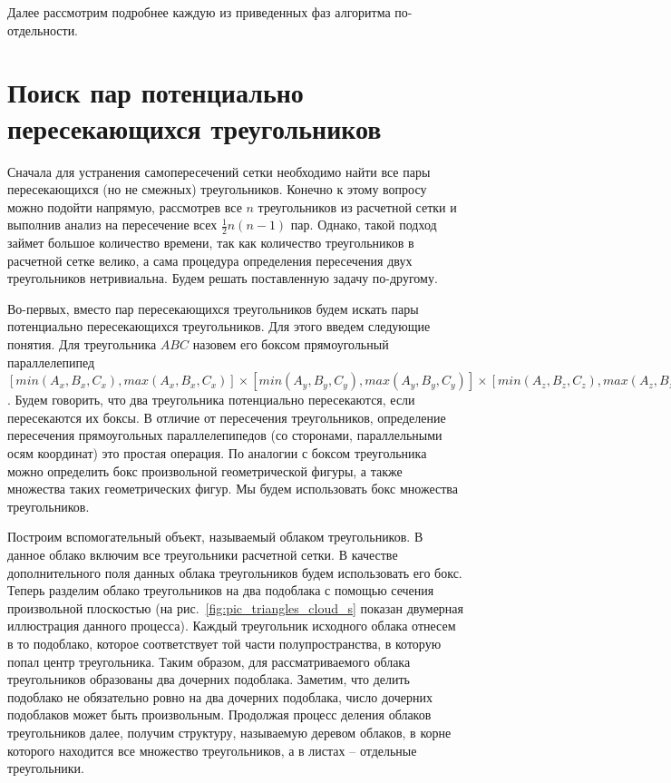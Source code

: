 \documentclass[
11pt,%
tightenlines,%
twoside,%
onecolumn,%
nofloats,%
nobibnotes,%
nofootinbib,%
superscriptaddress,%
noshowpacs,%
centertags]%
{revtex4}
\begin{document}
Далее рассмотрим подробнее каждую из приведенных фаз алгоритма по-отдельности.

\section{Поиск пар потенциально пересекающихся треугольников}

Сначала для устранения самопересечений сетки необходимо найти все пары пересекающихся (но не смежных) треугольников.
Конечно к этому вопросу можно подойти напрямую, рассмотрев все $n$ треугольников из расчетной сетки и выполнив анализ на пересечение всех $\frac{1}{2}n(n - 1)$ пар.
Однако, такой подход займет большое количество времени, так как количество треугольников в расчетной сетке велико, а сама процедура определения пересечения двух треугольников нетривиальна.
Будем решать поставленную задачу по-другому.

Во-первых, вместо пар пересекающихся треугольников будем искать пары потенциально пересекающихся треугольников.
Для этого введем следующие понятия.
Для треугольника $ABC$ назовем его боксом прямоугольный параллелепипед $[min(A_x, B_x, C_x), max(A_x, B_x, C_x)] \times [min(A_y, B_y, C_y), max(A_y, B_y, C_y)] \times [min(A_z, B_z, C_z), max(A_z, B_z, C_z)]$.
Будем говорить, что два треугольника потенциально пересекаются, если пересекаются их боксы.
В отличие от пересечения треугольников, определение пересечения прямоугольных параллелепипедов (со сторонами, параллельными осям координат) это простая операция.
По аналогии с боксом треугольника можно определить бокс произвольной геометрической фигуры, а также множества таких геометрических фигур.
Мы будем использовать бокс множества треугольников.

Построим вспомогательный объект, называемый облаком треугольников.
В данное облако включим все треугольники расчетной сетки.
В качестве дополнительного поля данных облака треугольников будем использовать его бокс.
Теперь разделим облако треугольников на два подоблака с помощью сечения произвольной плоскостью (на рис.~\ref{fig:pic_triangles_cloud_s} показан двумерная иллюстрация данного процесса).
Каждый треугольник исходного облака отнесем в то подоблако, которое соответствует той части полупространства, в которую попал центр треугольника.
Таким образом, для рассматриваемого облака треугольников образованы два дочерних подоблака.
Заметим, что делить подоблако не обязательно ровно на два дочерних подоблака, число дочерних подоблаков может быть произвольным.
Продолжая процесс деления облаков треугольников далее, получим структуру, называемую деревом облаков, в корне которого находится все множество треугольников, а в листах -- отдельные треугольники.
\end{document}
